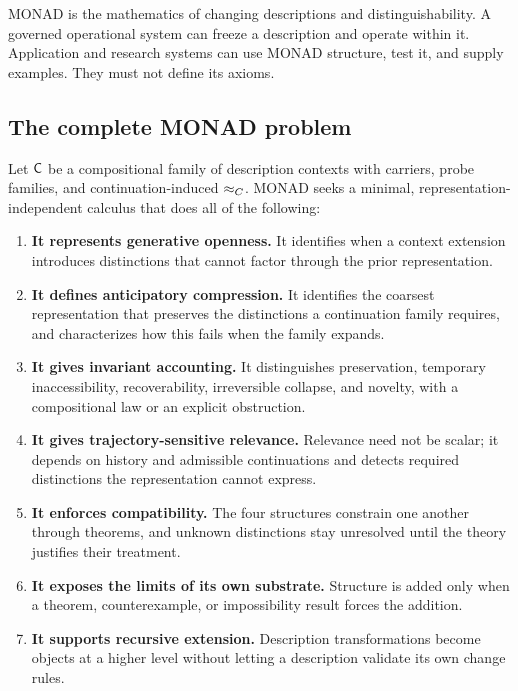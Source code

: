 MONAD is the mathematics of changing descriptions and
distinguishability. A governed operational system can freeze a
description and operate within it. Application and research systems
can use MONAD structure, test it, and supply examples. They must not
define its axioms.

\subsection{The complete MONAD problem}

Let $\mathsf{C}$ be a compositional family of description contexts with
carriers, probe families, and continuation-induced
$\approx_{C}$. MONAD seeks a minimal, representation-independent
calculus that does all of the following:
\begin{enumerate}
  \item \textbf{It represents generative openness.} It identifies when
    a context extension introduces distinctions that cannot factor
    through the prior representation.
  \item \textbf{It defines anticipatory compression.} It identifies
    the coarsest representation that preserves the distinctions a
    continuation family requires, and characterizes how this fails
    when the family expands.
  \item \textbf{It gives invariant accounting.} It distinguishes
    preservation, temporary inaccessibility, recoverability,
    irreversible collapse, and novelty, with a compositional law or an
    explicit obstruction.
  \item \textbf{It gives trajectory-sensitive relevance.} Relevance need
    not be scalar; it depends on history and admissible continuations and
    detects required distinctions the representation cannot express.
  \item \textbf{It enforces compatibility.} The four structures
    constrain one another through theorems, and unknown distinctions
    stay unresolved until the theory justifies their treatment.
  \item \textbf{It exposes the limits of its own substrate.} Structure
    is added only when a theorem, counterexample, or impossibility
    result forces the addition.
  \item \textbf{It supports recursive extension.} Description
    transformations become objects at a higher level without letting a
    description validate its own change rules.
\end{enumerate}

